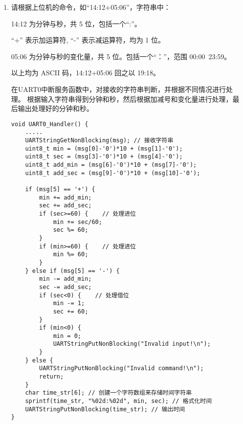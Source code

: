 \documentclass[12pt, a4paper, oneside]{ctexart}
\begin{document}
\begin{enumerate}[listparindent=2em]
        \begin{lstlisting}[language=C++]
void UART0_Handler() {
    .....
    UARTStringGetNonBlocking(msg); // 接收字符串
    for (int i=0;i<12;i++) {
        if (strncmp(msg, month[i], 3) == 0) {
            mouth = i;
            break;
        }
        if (i==11) {
            UARTStringPutNonBlocking("Invalid month!\n");
            return;
        }
    }
    
    // 确定增加的月份
    if (msg[3] == '+') { 
        add = (msg[4]-'0')*10 + (msg[5]-'0');
        mouth += add;
        mouth %= 12; // 防止超界
    } else if (msg[3] == '-') {
        add = (msg[4]-'0')*10 + (msg[5]-'0');
        mouth -= add;
        mouth = (mouth+12)%12; // 防止超界
    } else {
        UARTStringPutNonBlocking("Invalid command!\n");
        return;
    }

    UARTStringPutNonBlocking(month[mouth]); // 输出处理好的月份


}

    \end{lstlisting}
    
    \item 请根据上位机的命令，如“14:12+05:06”，字符串中：
    
    14:12 为分钟与秒，共 5 位，包括一个“:”。

    “+” 表示加运算符, “-” 表示减运算符，均为 1 位。

    05:06 为分钟与秒的变化量，共 5 位。包括一个“：”，范围 00:00~23:59。

    以上均为 ASCII 码，14:12+05:06 回之以 19:18。

    {\kaishu 在UART0中断服务函数中，对接收的字符串判断，并根据不同情况进行处理。
    根据输入字符串得到分钟和秒，然后根据加减号和变化量进行处理，最后输出处理好的分钟和秒。}

    \begin{lstlisting}
void UART0_Handler() {
    .....
    UARTStringGetNonBlocking(msg); // 接收字符串
    uint8_t min = (msg[0]-'0')*10 + (msg[1]-'0');
    uint8_t sec = (msg[3]-'0')*10 + (msg[4]-'0');
    uint8_t add_min = (msg[6]-'0')*10 + (msg[7]-'0');
    uint8_t add_sec = (msg[9]-'0')*10 + (msg[10]-'0');

    if (msg[5] == '+') {
        min += add_min;
        sec += add_sec;
        if (sec>=60) {    // 处理进位
            min += sec/60;
            sec %= 60;
        }
        if (min>=60) {    // 处理进位
            min %= 60;
        }
    } else if (msg[5] == '-') {
        min -= add_min;
        sec -= add_sec;
        if (sec<0) {    // 处理借位
            min -= 1;
            sec += 60;
        }
        if (min<0) {    
            min = 0;
            UARTStringPutNonBlocking("Invalid input!\n");
        }
    } else {
        UARTStringPutNonBlocking("Invalid command!\n");
        return;
    }
    char time_str[6]; // 创建一个字符数组来存储时间字符串
    sprintf(time_str, "%02d:%02d", min, sec); // 格式化时间
    UARTStringPutNonBlocking(time_str); // 输出时间 
}
    \end{lstlisting}
        


\end{enumerate}
        
\end{document}
